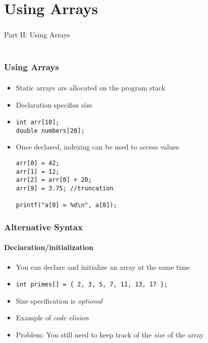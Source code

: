 \documentclass[]{beamer}
\begin{document}
\section{Using Arrays}

\begin{frame}
    \frametitle{}
    \framesubtitle{}
    
    \begin{center}
    {\Huge Part II: Using Arrays}\\
    {\Large ~}
    \end{center}

\end{frame}


\begin{frame}[fragile]
    \frametitle{Using Arrays}
    \framesubtitle{}

\begin{itemize}[<+->]
  \item Static arrays are allocated on the program stack
  \item Declaration specifies size
  \item[~]
\begin{verbatim}
int arr[10];
double numbers[20];
\end{verbatim}
  \item Once declared, indexing can be used to access values
\begin{verbatim}
arr[0] = 42;
arr[1] = 12;
arr[2] = arr[0] + 20;
arr[9] = 3.75; //truncation

printf("a[0] = %d\n", a[0]); 
\end{verbatim}
\end{itemize}

\end{frame}

\begin{frame}[fragile]
    \frametitle{Alternative Syntax}
    \framesubtitle{Declaration/initialization}

\begin{itemize}[<+->]
  \item You can declare and initialize an array at the same time
  \item[~]
\begin{verbatim}
int primes[] = { 2, 3, 5, 7, 11, 13, 17 };
\end{verbatim}
  \item Size specification is \emph{optional}
  \item Example of \emph{code elision} 
  \item Problem: You still need to keep track of the \emph{size} of the array
\end{itemize}

\end{frame}
\end{document}
